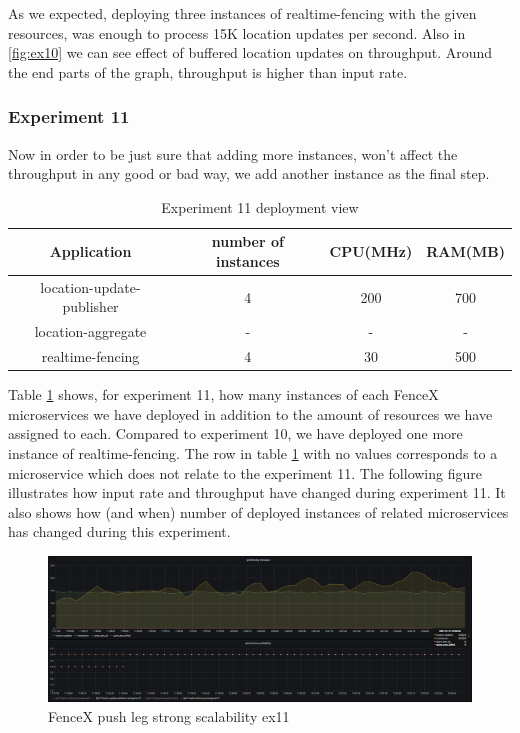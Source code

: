 \documentclass[a4]{report}
\begin{document}
    \clearpage

    As we expected, deploying three instances of realtime-fencing with the given resources, was enough to process 15K
    location updates per second.
    Also in \ref{fig:ex10} we can see effect of buffered location updates on throughput.
    Around the end parts of the graph, throughput is higher than input rate.

    \subsubsection{Experiment 11}
    Now in order to be just sure that adding more instances, won't affect the throughput in any good or bad way, we
    add another instance as the final step.

    \begin{table}[h!]
        \centering
        \begin{tabular}{|c|c|c|c|}
            \hline
            Application               & number of instances & CPU(MHz) & RAM(MB) \\
            \hline
            location-update-publisher & 4                   & 200      & 700     \\
            location-aggregate        & -                   & -        & -       \\
            realtime-fencing          & 4                   & 30       & 500     \\
            \hline
        \end{tabular}
        \caption{Experiment 11 deployment view}
        \label{table:ex11-dv}
    \end{table}

    Table \ref{table:ex11-dv} shows, for experiment 11, how many instances of each FenceX microservices we have
    deployed in addition to the amount of resources we have assigned to each.
    Compared to experiment 10, we have deployed one more instance of realtime-fencing.
    The row in table \ref{table:ex11-dv} with no values corresponds to a microservice which does not relate to the
    experiment 11.
    The following figure illustrates how input rate and throughput have changed during experiment 11.
    It also shows how (and when) number of deployed instances of related microservices has changed during this
    experiment.

    \begin{figure}
        \caption{FenceX push leg strong scalability ex11}
        \label{fig:ex11}
        \includegraphics[scale=0.5]{images/evaluation/ex11-benchmarking-ongoing-2per4sec.png}
    \end{figure}
\end{document}
